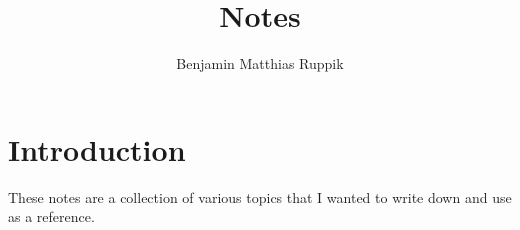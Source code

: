 \documentclass[nobib]{tufte-book} %
\title{Notes} %
\author{Benjamin Matthias Ruppik} %
\theoremstyle{definition}
\theoremstyle{remark}
\begin{document}
\frontmatter




\tableofcontents %







\section*{Introduction}

These notes are a collection of various topics
that I wanted to write down and use as a reference.


\mainmatter







\end{document}
